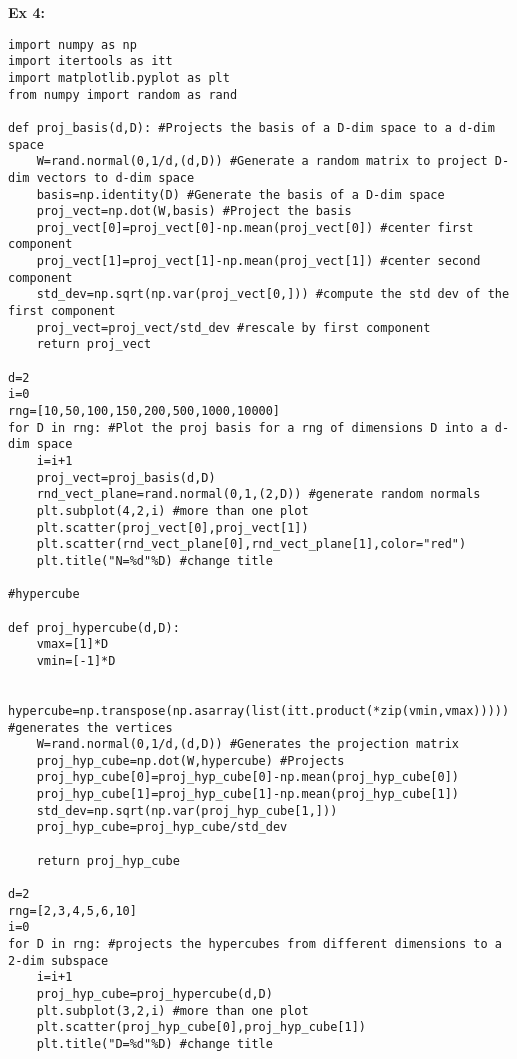 \documentclass[11pt, english]{article}
\begin{document}
\textbf{Ex 4:}

\begin{lstlisting}
import numpy as np
import itertools as itt
import matplotlib.pyplot as plt
from numpy import random as rand
	
def proj_basis(d,D): #Projects the basis of a D-dim space to a d-dim space
	W=rand.normal(0,1/d,(d,D)) #Generate a random matrix to project D-dim vectors to d-dim space 
	basis=np.identity(D) #Generate the basis of a D-dim space
	proj_vect=np.dot(W,basis) #Project the basis
	proj_vect[0]=proj_vect[0]-np.mean(proj_vect[0]) #center first component
	proj_vect[1]=proj_vect[1]-np.mean(proj_vect[1]) #center second component
	std_dev=np.sqrt(np.var(proj_vect[0,])) #compute the std dev of the first component 
	proj_vect=proj_vect/std_dev #rescale by first component
	return proj_vect
	
d=2
i=0
rng=[10,50,100,150,200,500,1000,10000]
for D in rng: #Plot the proj basis for a rng of dimensions D into a d-dim space
	i=i+1    
	proj_vect=proj_basis(d,D)
	rnd_vect_plane=rand.normal(0,1,(2,D)) #generate random normals
	plt.subplot(4,2,i) #more than one plot
	plt.scatter(proj_vect[0],proj_vect[1]) 
	plt.scatter(rnd_vect_plane[0],rnd_vect_plane[1],color="red")
	plt.title("N=%d"%D) #change title
	
#hypercube
	
def proj_hypercube(d,D):	
	vmax=[1]*D
	vmin=[-1]*D
	
	hypercube=np.transpose(np.asarray(list(itt.product(*zip(vmin,vmax))))) #generates the vertices
	W=rand.normal(0,1/d,(d,D)) #Generates the projection matrix
	proj_hyp_cube=np.dot(W,hypercube) #Projects
	proj_hyp_cube[0]=proj_hyp_cube[0]-np.mean(proj_hyp_cube[0])
	proj_hyp_cube[1]=proj_hyp_cube[1]-np.mean(proj_hyp_cube[1])
	std_dev=np.sqrt(np.var(proj_hyp_cube[1,]))
	proj_hyp_cube=proj_hyp_cube/std_dev
	
	return proj_hyp_cube
	
d=2
rng=[2,3,4,5,6,10]
i=0
for D in rng: #projects the hypercubes from different dimensions to a 2-dim subspace
	i=i+1
	proj_hyp_cube=proj_hypercube(d,D)	
	plt.subplot(3,2,i) #more than one plot
	plt.scatter(proj_hyp_cube[0],proj_hyp_cube[1])
	plt.title("D=%d"%D) #change title
	
	
\end{lstlisting}
\end{document}
